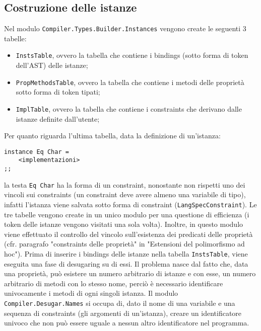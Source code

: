 \documentclass[10pt,a4paper]{article}
\begin{document}
\subsection{Costruzione delle istanze}
Nel modulo \texttt{Compiler.Types.Builder.Instances} vengono create le seguenti 3 tabelle:
\begin{itemize}
    \item \texttt{InstsTable}, ovvero la tabella che contiene i bindings (sotto forma di token dell'AST) delle istanze;
    \item \texttt{PropMethodsTable}, ovvero la tabella che contiene i metodi delle proprietà sotto forma di token
    tipati;
    \item \texttt{ImplTable}, ovvero la tabella che contiene i constraints che derivano dalle istanze definite
    dall'utente;
\end{itemize}
Per quanto riguarda l'ultima tabella, data la definizione di un'istanza:
\begin{lstlisting}
instance Eq Char =
    <implementazioni>
;;
\end{lstlisting}
la testa \texttt{Eq Char} ha la forma di un constraint, nonostante non rispetti uno dei vincoli sui constraints (un
constraint deve avere almeno una variabile di tipo), infatti l'istanza viene salvata sotto forma di constraint
(\texttt{LangSpecConstraint}).
Le tre tabelle vengono create in un unico modulo per una questione di efficienza (i token delle istanze vengono visitati
una sola volta). Inoltre, in questo
modulo viene effettuato il controllo del vincolo sull'esistenza dei predicati delle proprietà (cfr. paragrafo "constraints
delle proprietà" in "Estensioni del polimorfismo ad hoc"). Prima di inserire i bindings delle istanze nella
tabella \texttt{InstsTable}, viene eseguita una fase di desugaring su di essi. Il problema nasce dal fatto che, data
una proprietà, può esistere un numero arbitrario di istanze e con esse, un numero arbitrario di metodi con lo stesso
nome, perciò è necessario identificare univocamente i metodi di ogni singoli istanza. Il modulo
\texttt{Compiler.Desugar.Names} si occupa di, dato il nome di una variabile e una sequenza di constraints (gli argomenti
di un'istanza), creare un identificatore univoco che non può essere uguale a nessun altro identificatore nel programma.
\end{document}
